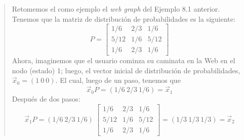 			\begin{quote}
				Retomemos el como ejemplo el \textit{web graph} del Ejemplo 8.1 anterior. Tenemos que la matriz de distribución de probabilidades es la siguiente:
				\[
				P =
				\begin{bmatrix}
					1/6 & 2/3 & 1/6 \\
					5/12 & 1/6 & 5/12 \\
					1/6 & 2/3 & 1/6
				\end{bmatrix}
				\]
				Ahora, imaginemos que el usuario cominza su caminata en la Web en el nodo (estado) 1; luego, el vector inicial de distribución de probabilidades, $\vec{x}_0 = (1 \ 0 \ 0)$. El cual, luego de un paso, tenemos que
				\begin{equation}
					\vec{x}_0 P = (1/6 \ 2/3 \ 1/6) = \vec{x}_1
				\end{equation}
				Después de dos pasos:
				\begin{equation}
					\vec{x}_1 P = (1/6 \ 2/3 \ 1/6) \ \begin{bmatrix}
														1/6 & 2/3 & 1/6 \\
														5/12 & 1/6 & 5/12 \\
														1/6 & 2/3 & 1/6	
													\end{bmatrix} = (1/3 \ 1/3 \ 1/3) = \vec{x}_2
				\end{equation}
			\end{quote}